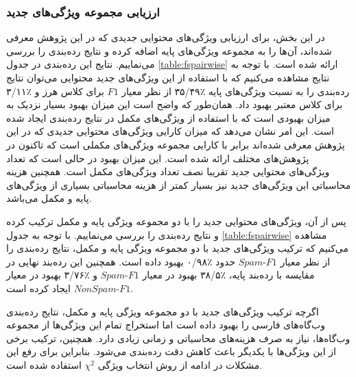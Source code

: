 \documentclass[twoside, a4paper,11pt]{book}
\numberwithin{equation}{chapter}
\numberwithin{table}{chapter}
\numberwithin{figure}{chapter}
\numberwithin{equation}{chapter}
\begin{document}
\subsubsection{ارزیابی مجموعه ویژگی‌های جدید}
\label{subsubsection:experiments-results-content-fs3}
در این بخش، برای ارزیابی ویژگی‌های محتوایی جدیدی که در این پژوهش معرفی شده‌اند، آن‌ها را به مجموعه ویژگی‌های پایه اضافه کرده و نتایج رده‌بندی را بررسی می‌نماییم. نتایج این رده‌بندی در جدول \ref{table:fspairwise} ارائه شده است. با توجه به نتایج مشاهده می‌کنیم که با استفاده از این ویژگی‌های جدید محتوایی می‌توان نتایج رده‌بندی را به نسبت ویژگی‌های پایه ٪۳۵/۴۹ از نظر معیار $F1$ برای کلاس هرز و ٪۳/۱۱  برای کلاس معتبر بهبود داد. همان‌طور که واضح است این میزان بهبود بسیار نزدیک به میزان بهبودی است که با استفاده از ویژگی‌های مکمل در نتایج رده‌بندی ایجاد شده است. این امر نشان می‌دهد که میزان کارایی ویژگی‌های محتوایی جدیدی که در این پژوهش معرفی شده‌اند برابر با کارایی مجموعه ویژگی‌های مکملی است که تاکنون در پژوهش‌های مختلف ارائه شده است. این میزان بهبود در حالی است که تعداد ویژگی‌های محتوایی جدید تقریبا نصف تعداد ویژگی‌های مکمل است. همچنین هزینه محاسباتی این ویژگی‌های جدید نیز بسیار کمتر از هزینه محاسباتی بسیاری از ویژگی‌های پایه و مکمل می‌باشد.

پس از آن، ویژگی‌های محتوایی جدید را با دو مجموعه ویژگی پایه و مکمل ترکیب کرده و نتایج رده‌بندی را بررسی می‌نماییم. با توجه به جدول \ref{table:fspairwise} مشاهده می‌کنیم که ترکیب ویژگی‌های جدید با دو مجموعه ویژگی پایه و مکمل، نتایج رده‌بندی را از نظر معیار $Spam\text{-}F1$ حدود ٪۰/۹۸ بهبود داده است. همچنین این رده‌بند نهایی در مقایسه با رده‌بند پایه، ٪۳۸/۵ بهبود در معیار $Spam\text{-}F1$ و ٪۳/۷۶ بهبود در معیار $NonSpam\text{-}F1$ ایجاد کرده است.

اگرچه ترکیب ویژگی‌های جدید با دو مجموعه ویژگی پایه و مکمل، نتایج رده‌بندی وب‌گاه‌های فارسی را بهبود داده است اما استخراج تمام این ویژگی‌ها از مجموعه وب‌گاه‌ها، نیاز به صرف هزینه‌های محاسباتی و زمانی زیادی دارد. همچنین، ترکیب برخی از این ویژگی‌ها با یکدیگر باعث کاهش دقت رده‌بندی می‌شود. بنابراین برای رفع این مشکلات در ادامه از روش انتخاب ویژگی  $\chi^2$ استفاده شده است.
\end{document}
